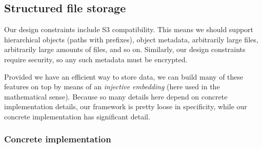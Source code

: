 \documentclass[a4paper,10pt]{article}
\begin{document}
\subsection{Structured file storage}

Our design constraints include S3 compatibility. This means we should support
hierarchical objects (paths with prefixes), object metadata, arbitrarily large
files, arbitrarily large amounts of files, and so on. Similarly, our design
constraints require security, so any such metadata must be encrypted.

Provided we have an efficient way to store data, we can build many of these
features on top by means of an {\em injective embedding} (here used in the
mathematical sense). Because so many details here depend on concrete
implementation details, our framework is pretty loose in specificity, while
our concrete implementation has significant detail.

\subsubsection{Concrete implementation}
\end{document}
